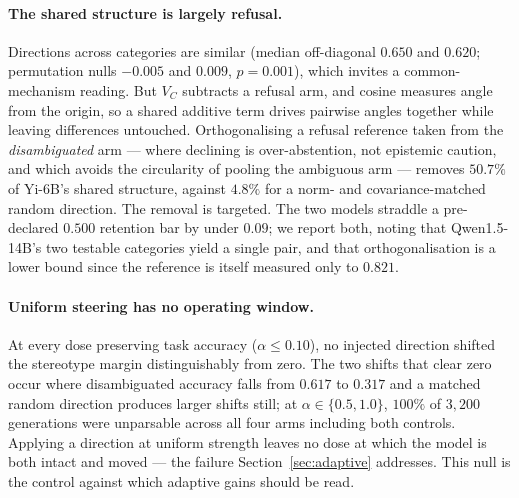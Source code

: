 \paragraph{The shared structure is largely refusal.}
Directions across categories are similar (median off-diagonal $0.650$ and
$0.620$; permutation nulls $-0.005$ and $0.009$, $p=0.001$), which invites a
common-mechanism reading. But $V_C$ subtracts a refusal arm, and cosine measures
angle from the origin, so a shared additive term drives pairwise angles together
while leaving differences untouched. Orthogonalising a refusal reference taken
from the \emph{disambiguated} arm --- where declining is over-abstention, not
epistemic caution, and which avoids the circularity of pooling the ambiguous arm
--- removes $50.7\%$ of Yi-6B's shared structure, against $4.8\%$ for a
norm- and covariance-matched random direction. The removal is targeted.
The two models straddle a pre-declared $0.500$ retention bar by under $0.09$; we
report both, noting that Qwen1.5-14B's two testable categories yield a single
pair, and that orthogonalisation is a lower bound since the reference is itself
measured only to $0.821$.

\paragraph{Uniform steering has no operating window.}
At every dose preserving task accuracy ($\alpha \leq 0.10$), no injected
direction shifted the stereotype margin distinguishably from zero. The two
shifts that clear zero occur where disambiguated accuracy falls from $0.617$ to
$0.317$ and a matched random direction produces larger shifts still; at
$\alpha \in \{0.5, 1.0\}$, $100\%$ of $3{,}200$ generations were unparsable
across all four arms including both controls. Applying a direction at uniform
strength leaves no dose at which the model is both intact and moved --- the
failure Section~\ref{sec:adaptive} addresses. This null is the control against
which adaptive gains should be read.

%
